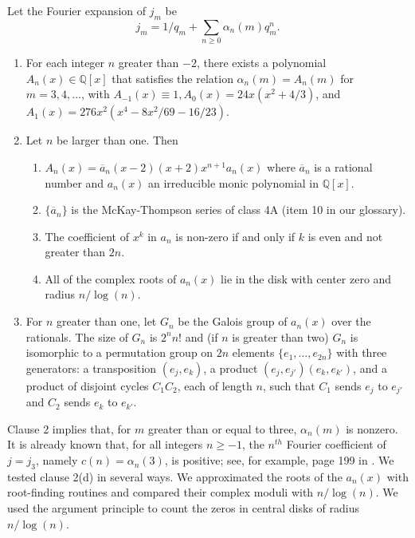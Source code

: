 \documentclass{article}
\begin{document}
\begin{conjecture}
Let the Fourier expansion of 
$j_m$ be
$$j_m = 1/q_m +
\sum_{n\geq 0} \alpha_n(m) q_m^n.$$
\begin{enumerate}
\item For each integer $n$
greater than $-2$,
there exists a polynomial
$A_n(x) \in \mathbb{Q}[x]$
that satisfies the relation
$\alpha_n(m) = A_n(m)$ for $m = 3, 4, ...$, with
$A_{-1}(x) \equiv 1,
A_0(x) = 24x(x^2 + 4/3)$,
and $A_1(x) = 276x^2(x^4-8x^2/69 - 16/23)$.
\item Let $n$ be larger than one. Then
\begin{enumerate}
\item $A_n(x) = \overline{a}_n (x-2)(x+2)x^{n+1}a_n(x)$
where $\overline{a}_n$ is a rational number and 
$a_n(x)$ an irreducible monic polynomial in $\mathbb{Q}[x]$.
\item $\{\overline{a}_n\}$
is  the McKay-Thompson series of class 4A 
(item 10 in our glossary).
\item The coefficient of $x^k$ in $a_n$
is non-zero if and only if $k$ is even and
not greater than $2n$.
\item All of the complex roots of $a_n(x)$ lie in the disk
with center zero and radius $n/\log (n)$.
\end{enumerate}
\item For $n$ greater than one, let 
$G_n$ be the Galois group
of $a_n(x)$ over the rationals. The
size of $G_n$ is $2^n n!$
and (if $n$ is greater than two) 
$G_n$ is isomorphic
to a permutation group on $2n$ elements
$\{e_1, ..., e_{2n}\}$
with three generators: a transposition
$(e_j, e_k)$, a product $(e_j,e_{j'})(e_k, e_{k'})$,
and  a product of disjoint cycles
$C_1 C_2$, each of length $n$,
such that $C_1$ sends $e_j$ to $e_{j'}$
and $C_2$ sends $e_k$ to $e_{k'}$.
\end{enumerate}
\end{conjecture} \noindent
Clause 2 implies that, for 
$m$ greater than  or equal to three,
$\alpha_n(m)$ is nonzero.
\noindent
It is already known that,
for all integers $n \geq -1$,
the $n^{th}$ Fourier coefficient of
$j = j_3$, namely
$c(n) = \alpha_n(3)$,
is positive;
see, for example,
page 199 in \cite{rankinModular}.
\newline \newline \noindent
We tested clause 2(d) in several ways.
We approximated the roots of
the $a_n(x)$  with root-finding routines
and compared their
complex moduli with $n/\log (n)$.
We used the argument principle to count the zeros 
in central disks of radius $n/\log (n)$. 
\end{document}
